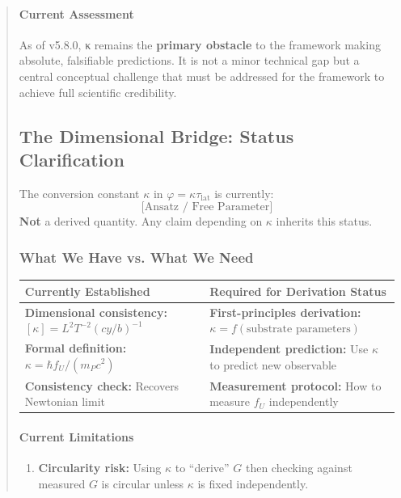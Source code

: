 \documentclass[11pt,titlepage]{article}
\begin{document}
\begin{abstract}
\paragraph{Current Assessment}
As of v5.8.0, κ remains the \textbf{primary obstacle} to the framework making absolute, falsifiable predictions. It is not a minor technical gap but a central conceptual challenge that must be addressed for the framework to achieve full scientific credibility.


\subsection{The Dimensional Bridge: Status Clarification}
\label{sec:units-bridge-status}

\begin{tcolorbox}[colback=red!5!white,colframe=red!75!black,title=Critical Status Update]
The conversion constant $\kappa$ in $\varphi = \kappa \tau_{\mathrm{lat}}$ is currently:
\[
\boxed{\text{[Ansatz / Free Parameter]}}
\]
\textbf{Not} a derived quantity. Any claim depending on $\kappa$ inherits this status.
\end{tcolorbox}

\subsubsection{What We Have vs. What We Need}

\begin{tabular}{p{}p{}}
\textbf{Currently Established} & \textbf{Required for Derivation Status} \\ \hline
\textbf{Dimensional consistency:} $[\kappa] = L^2 T^{-2} (cy/b)^{-1}$ & \textbf{First-principles derivation:} $\kappa = f(\text{substrate parameters})$ \\
\textbf{Formal definition:} $\kappa = \hbar f_U / (m_P c^2)$ & \textbf{Independent prediction:} Use $\kappa$ to predict new observable \\
\textbf{Consistency check:} Recovers Newtonian limit & \textbf{Measurement protocol:} How to measure $f_U$ independently \\
\end{tabular}

\paragraph{Current Limitations}
\begin{enumerate}
\item \textbf{Circularity risk:} Using $\kappa$ to ``derive'' $G$ then checking against measured $G$ is circular unless $\kappa$ is fixed independently.


\end{enumerate}
\end{abstract}
\end{document}
